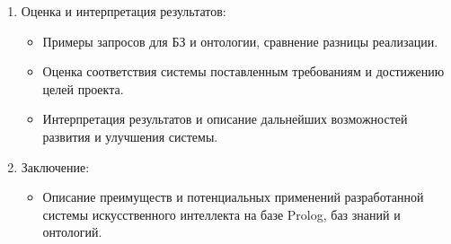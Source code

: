 \documentclass[12pt,a4paper]{article}
\begin{document}
\begin{enumerate}
\begin{itemize}
\item Создание правил и логики вывода для принятия решений на основе базы знаний и онтологии.

\item Тестирование и отладка системы, обеспечение ее функциональности и эффективности.

\end{itemize}



\item Оценка и интерпретация результатов:
\begin{itemize}

\item Примеры запросов для БЗ и онтологии, сравнение разницы реализации.

\item Оценка соответствия системы поставленным требованиям и достижению целей проекта.

\item Интерпретация результатов и описание дальнейших возможностей развития и улучшения системы.

\end{itemize}



\item Заключение:
\begin{itemize}

\item Описание преимуществ и потенциальных применений разработанной системы искусственного интеллекта на базе Prolog, баз знаний и онтологий.

\end{itemize}



\end{enumerate}
\end{document}
